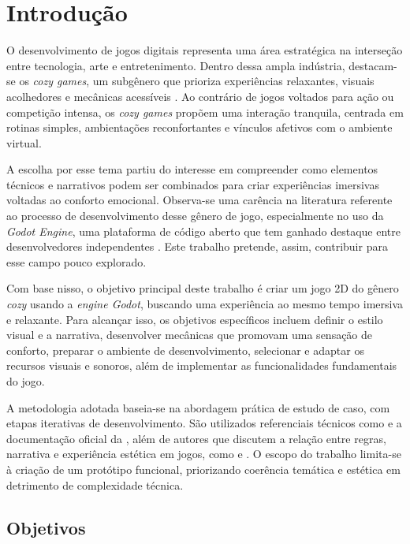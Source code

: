\chapter{Introdução}
\label{cap:01}

O desenvolvimento de jogos digitais representa uma área estratégica na interseção entre tecnologia, arte e entretenimento. Dentro dessa ampla indústria, destacam-se os \textit{cozy games}, um subgênero que prioriza experiências relaxantes, visuais acolhedores e mecânicas acessíveis \cite{waszkiewicz2020}. Ao contrário de jogos voltados para ação ou competição intensa, os \textit{cozy games} propõem uma interação tranquila, centrada em rotinas simples, ambientações reconfortantes e vínculos afetivos com o ambiente virtual.

A escolha por esse tema partiu do interesse em compreender como elementos técnicos e narrativos podem ser combinados para criar experiências imersivas voltadas ao conforto emocional. Observa-se uma carência na literatura referente ao processo de desenvolvimento desse gênero de jogo, especialmente no uso da \textit{Godot Engine}, uma plataforma de código aberto que tem ganhado destaque entre desenvolvedores independentes \cite{GodotDocs2024}. Este trabalho pretende, assim, contribuir para esse campo pouco explorado.

 Com base nisso, o objetivo principal deste trabalho é criar um jogo 2D do gênero \textit{cozy} usando a \textit{engine Godot}, buscando uma experiência ao mesmo tempo imersiva e relaxante. Para alcançar isso, os objetivos específicos incluem definir o estilo visual e a narrativa, desenvolver mecânicas que promovam uma sensação de conforto, preparar o ambiente de desenvolvimento, selecionar e adaptar os recursos visuais e sonoros, além de implementar as funcionalidades fundamentais do jogo.

A metodologia adotada baseia-se na abordagem prática de estudo de caso, com etapas iterativas de desenvolvimento. São utilizados referenciais técnicos como  e a documentação oficial da , além de autores que discutem a relação entre regras, narrativa e experiência estética em jogos, como  e . O escopo do trabalho limita-se à criação de um protótipo funcional, priorizando coerência temática e estética em detrimento de complexidade técnica.


\section{Objetivos}

